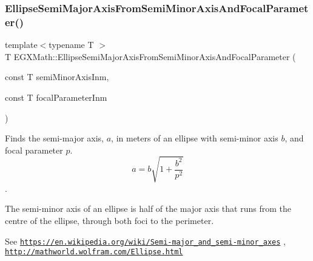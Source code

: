 \mbox{\label{group___e_g_x_math-_geometry-2_d-_ellipse-_semi_major_axis_ga8d8abd93ee6cdf43ba490874218f925f}} 
\subsubsection{\texorpdfstring{Ellipse\+Semi\+Major\+Axis\+From\+Semi\+Minor\+Axis\+And\+Focal\+Parameter()}{EllipseSemiMajorAxisFromSemiMinorAxisAndFocalParameter()}}
{\footnotesize\ttfamily template$<$typename T $>$ \\
T E\+G\+X\+Math\+::\+Ellipse\+Semi\+Major\+Axis\+From\+Semi\+Minor\+Axis\+And\+Focal\+Parameter (\begin{DoxyParamCaption}\item[{const T}]{semi\+Minor\+Axis\+Inm,  }\item[{const T}]{focal\+Parameter\+Inm }\end{DoxyParamCaption})}



Finds the semi-\/major axis, $a$, in meters of an ellipse with semi-\/minor axis $b$, and focal parameter $p$. \[ a=b\sqrt{1+\dfrac{b^2}{p^2}} \]. 

The semi-\/minor axis of an ellipse is half of the major axis that runs from the centre of the ellipse, through both foci to the perimeter.

See \href{https://en.wikipedia.org/wiki/Semi-major_and_semi-minor_axes}{\tt https\+://en.\+wikipedia.\+org/wiki/\+Semi-\/major\+\_\+and\+\_\+semi-\/minor\+\_\+axes} , \href{http://mathworld.wolfram.com/Ellipse.html}{\tt http\+://mathworld.\+wolfram.\+com/\+Ellipse.\+html}


